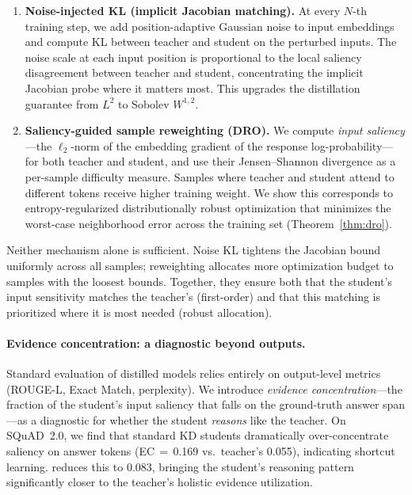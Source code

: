 \begin{enumerate}
\item \textbf{Noise-injected KL (implicit Jacobian matching).}
  At every $N$-th training step, we add position-adaptive Gaussian noise to input embeddings and compute KL between teacher and student on the perturbed inputs.
  The noise scale at each input position is proportional to the local saliency disagreement between teacher and student, concentrating the implicit Jacobian probe where it matters most.
  This upgrades the distillation guarantee from $L^2$ to Sobolev $W^{1,2}$.

\item \textbf{Saliency-guided sample reweighting (DRO).}
  We compute \emph{input saliency}---the $\ell_2$-norm of the embedding gradient of the response log-probability---for both teacher and student, and use their Jensen--Shannon divergence as a per-sample difficulty measure.
  Samples where teacher and student attend to different tokens receive higher training weight.
  We show this corresponds to entropy-regularized distributionally robust optimization that minimizes the worst-case neighborhood error across the training set (Theorem~\ref{thm:dro}).
\end{enumerate}

Neither mechanism alone is sufficient.
Noise KL tightens the Jacobian bound uniformly across all samples; reweighting allocates more optimization budget to samples with the loosest bounds.
Together, they ensure both that the student's input sensitivity matches the teacher's (first-order) and that this matching is prioritized where it is most needed (robust allocation).

\paragraph{Evidence concentration: a diagnostic beyond outputs.}
Standard evaluation of distilled models relies entirely on output-level metrics (ROUGE-L, Exact Match, perplexity).
We introduce \emph{evidence concentration}---the fraction of the student's input saliency that falls on the ground-truth answer span---as a diagnostic for whether the student \emph{reasons} like the teacher.
On SQuAD~2.0, we find that standard KD students dramatically over-concentrate saliency on answer tokens (EC\,$=$\,0.169 vs.\ teacher's 0.055), indicating shortcut learning.
\sagd{} reduces this to 0.083, bringing the student's reasoning pattern significantly closer to the teacher's holistic evidence utilization.

